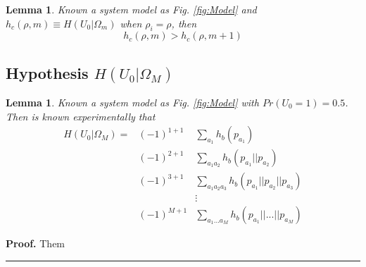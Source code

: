 \documentclass[a4paper,10pt]{article}
\newtheorem{mylemma}[mytheorem]{Lemma}
\newenvironment{myproof}[1][Proof]{\textbf{#1.} }{\ \rule{0.5em}{0.5em}}
\begin{document}
\begin{mdframed}[style=MDFStyGrayScreen]
\begin{mylemma}
 \label{lemm:H}
 Known a system model as Fig. \ref{fig:Model} and $h_{c}(\rho,m)\equiv H(U_0|\Omega_m)$ when $\rho_i=\rho$, then
  \begin{equation}\label{eq:Hcc1}
h_{c}(\rho,m) > h_{c}(\rho,m+1)
\end{equation}
\end{mylemma}
\end{mdframed}


\subsection{Hypothesis $H(U_0|\Omega_M)$}
\label{subsec:h0OmegaM}

\begin{mylemma}
 \label{lemm:1}
  Known a system model as Fig. \ref{fig:Model} with $Pr(U_0=1)=0.5$. Then is known 
experimentally that
\begin{equation}
 \begin{matrix}
 H(U_0|\Omega_M)= & (-1)^{1+1} & \sum \limits_{a_1}         h_b(p_{a_1}) \\
 ~                & (-1)^{2+1} & \sum \limits_{a_1 a_2}     h_b(p_{a_1}||p_{a_2}) \\ 
 ~                & (-1)^{3+1}  & \sum \limits_{a_1 a_2 a_3} h_b(p_{a_1}||p_{a_2}||p_{a_3}) \\ 
 ~                & ~ & \vdots \\
 ~                & (-1)^{M+1}  & \sum \limits_{a_1 ... a_M} h_b(p_{a_1}|| ... ||p_{a_M}) 
 \end{matrix}
\end{equation}

\end{mylemma}
\begin{myproof}
Them
\end{myproof}
\end{document}
